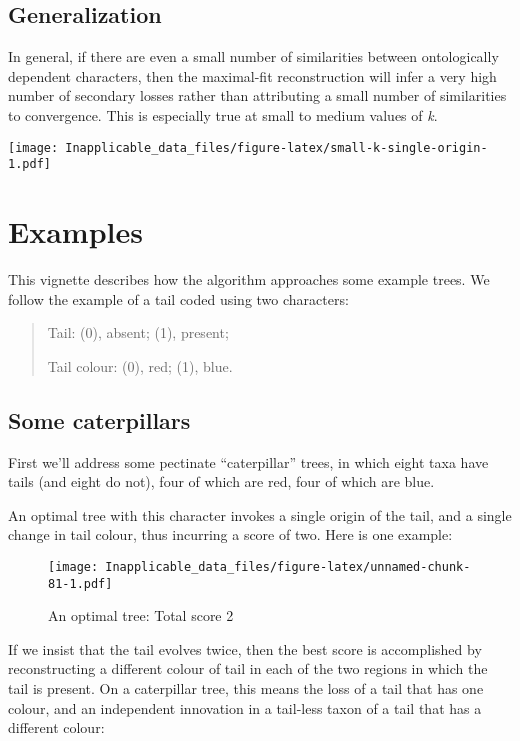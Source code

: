 \documentclass[]{book}
\theoremstyle{definition}
\theoremstyle{definition}
\theoremstyle{definition}
\theoremstyle{remark}
\begin{document}
\section{Generalization}\label{generalization}

In general, if there are even a small number of similarities between
ontologically dependent characters, then the maximal-fit reconstruction
will infer a very high number of secondary losses rather than
attributing a small number of similarities to convergence. This is
especially true at small to medium values of \emph{k}.

\texttt{[image: Inapplicable\_data\_files/figure-latex/small-k-single-origin-1.pdf]}

\hypertarget{examples}{\chapter{Examples}\label{examples}}

This vignette describes how the algorithm approaches some example trees.
We follow the example of a tail coded using two characters:

\begin{quote}
Tail: (0), absent; (1), present;

Tail colour: (0), red; (1), blue.
\end{quote}

\section{Some caterpillars}\label{some-caterpillars}

First we'll address some pectinate ``caterpillar'' trees, in which eight
taxa have tails (and eight do not), four of which are red, four of which
are blue.

An optimal tree with this character invokes a single origin of the tail,
and a single change in tail colour, thus incurring a score of two. Here
is one example:

\begin{figure}
\centering
\texttt{[image: Inapplicable\_data\_files/figure-latex/unnamed-chunk-81-1.pdf]}
\caption{\label{fig:unnamed-chunk-81}An optimal tree: Total score 2}
\end{figure}

If we insist that the tail evolves twice, then the best score is
accomplished by reconstructing a different colour of tail in each of the
two regions in which the tail is present. On a caterpillar tree, this
means the loss of a tail that has one colour, and an independent
innovation in a tail-less taxon of a tail that has a different colour:
\end{document}
